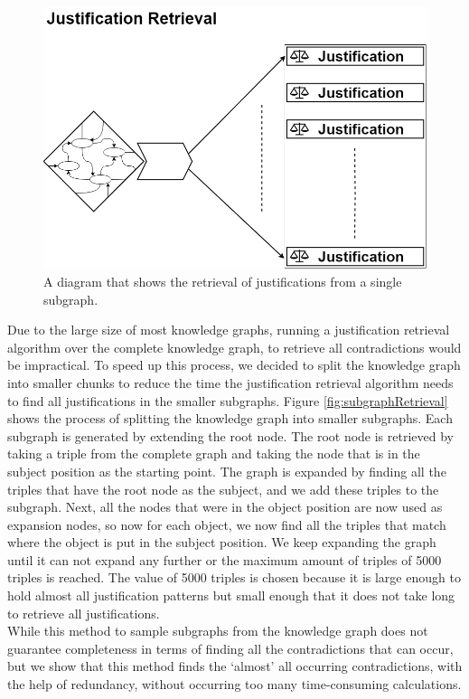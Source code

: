 \documentclass[11pt,letterpaper ,oneside ]{book}
\begin{document}
\begin{figure}
	\centering
	\includegraphics[width=\linewidth]{images/JustificationRetrieval.png}
	\caption{A diagram that shows the retrieval of justifications from a single subgraph.}
	\label{fig:JustificationRetrieval}
\end{figure}

Due to the large size of most knowledge graphs, running a justification retrieval algorithm over the complete knowledge graph, to retrieve all contradictions would be impractical. To speed up this process, we decided to split the knowledge graph into smaller chunks to reduce the time the justification retrieval algorithm needs to find all justifications in the smaller subgraphs. Figure \ref{fig:subgraphRetrieval} shows the process of splitting the knowledge graph into smaller subgraphs.
Each subgraph is generated by extending the root node. The root node is retrieved by taking a triple from the complete graph and taking the node that is in the subject position as the starting point. The graph is expanded by finding all the triples that have the root node as the subject, and we add these triples to the subgraph. Next, all the nodes that were in the object position are now used as expansion nodes, so now for each object, we now find all the triples that match where the object is put in the subject position. We keep expanding the graph until it can not expand any further or the maximum amount of triples of 5000 triples is reached. The value of 5000 triples is chosen because it is large enough to hold almost all justification patterns but small enough that it does not take long to retrieve all justifications.\\
While this method to sample subgraphs from the knowledge graph does not guarantee completeness in terms of finding all the contradictions that can occur, but we show that this method finds the `almost' all occurring contradictions, with the help of redundancy, without occurring too many time-consuming calculations. 
\end{document}

